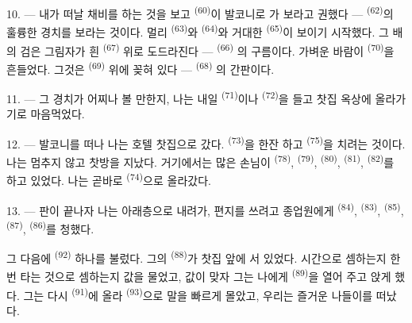 10. --- 내가 떠날 채비를 하는 것을 보고  \textsuperscript{(60)}이 발코니로
가 보라고 권했다 —  \textsuperscript{(62)}의 훌륭한 경치를 보라는 것이다.
멀리  \textsuperscript{(63)}와  \textsuperscript{(64)}와 거대한
 \textsuperscript{(65)}이 보이기 시작했다. 그 배의 검은 그림자가 흰
 \textsuperscript{(67)} 위로 도드라진다 —  \textsuperscript{(66)}
의 구름이다. 가벼운 바람이  \textsuperscript{(70)}을 흔들었다. 그것은
 \textsuperscript{(69)} 위에 꽂혀 있다 —  \textsuperscript{(68)}
의 간판이다.

\VUsaut{3.0mm}
\VUsaut{3.0mm}

11. --- 그 경치가 어찌나 볼 만한지, 나는 내일  \textsuperscript{(71)}이나
 \textsuperscript{(72)}을 들고 찻집 옥상에 올라가기로 마음먹었다.

12. --- 발코니를 떠나 나는 호텔 찻집으로 갔다.  \textsuperscript{(73)}을
한잔 하고  \textsuperscript{(75)}을 치려는 것이다. 나는 멈추지 않고
찻방을 지났다. 거기에서는 많은 손님이  \textsuperscript{(78)},
 \textsuperscript{(79)},  \textsuperscript{(80)},
 \textsuperscript{(81)},  \textsuperscript{(82)}를 하고
있었다. 나는 곧바로  \textsuperscript{(74)}으로 올라갔다.

13. --- 판이 끝나자 나는 아래층으로 내려가, 편지를 쓰려고 종업원에게 
\textsuperscript{(84)},  \textsuperscript{(83)},  \textsuperscript{(85)},
 \textsuperscript{(87)},  \textsuperscript{(86)}를 청했다.

그 다음에  \textsuperscript{(92)} 하나를 불렀다. 그의 
\textsuperscript{(88)}가 찻집 앞에 서 있었다. 시간으로 셈하는지 한 번 타는 것으로 셈하는지
값을 물었고, 값이 맞자 그는 나에게  \textsuperscript{(89)}을 열어 주고
앉게 했다. 그는 다시  \textsuperscript{(91)}에 올라 
\textsuperscript{(93)}으로 말을 빠르게 몰았고, 우리는 즐거운 나들이를 떠났다.

\VUsaut{6.0mm}
\VUfilet{22mm}
